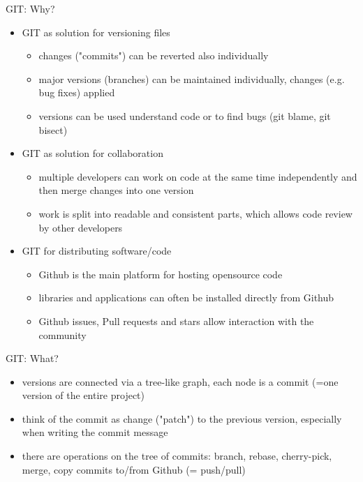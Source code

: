 \begin{frame}[fragile]{GIT: Why?}
    \begin{itemize}
        \item GIT as solution for versioning files\pause
            \begin{itemize}
                \item changes ("commits") can be reverted also individually
                \item major versions (branches) can be maintained individually, changes (e.g. bug
                    fixes) applied
                \item versions can be used understand code or to find bugs (git blame, git bisect)
            \end{itemize}
            \pause
        \item GIT as solution for collaboration\pause
            \begin{itemize}
                \item multiple developers can work on code at the same time independently and then
                    merge changes into one version
                \item work is split into readable and consistent parts, which allows code review by
                    other developers
            \end{itemize}
            \pause
        \item GIT for distributing software/code\pause
            \begin{itemize}
                \item Github is the main platform for hosting opensource code
                \item libraries and applications can often be installed directly from Github
                \item Github issues, Pull requests and stars allow interaction with the community
            \end{itemize}
    \end{itemize}
\end{frame}


\begin{frame}[fragile]{GIT: What?}
    \begin{itemize}
        \item versions are connected via a tree-like graph, each node is a commit (=one version of
            the entire project)\pause
        \item think of the commit as change ("patch") to the previous version, especially when
            writing the commit message\pause
        \item there are operations on the tree of commits: branch, rebase, cherry-pick, merge,
            copy commits to/from Github (= push/pull)
    \end{itemize}
\end{frame}


